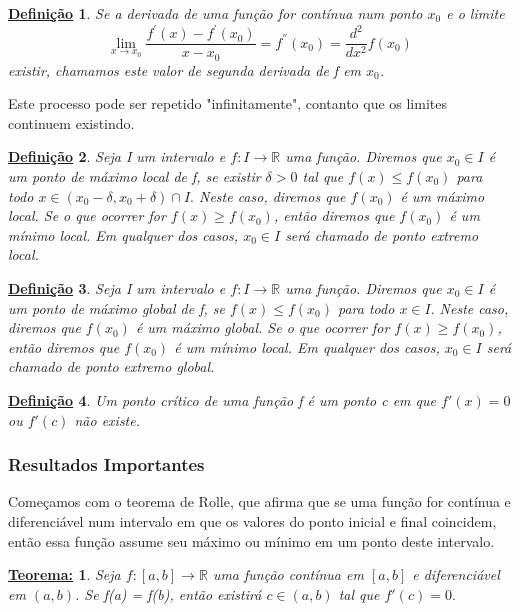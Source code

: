 \documentclass{article}
\newtheorem*{def*}{\underline{Defini\c c\~ao}}
\newtheorem*{thm*}{\underline{Teorema:}}
\begin{document}
    \begin{def*}
        Se a derivada de uma fun\c c\~ao for cont\'inua num ponto $x_0$ e o limite 
        $$
        \lim_{x\to{x_0}}\frac{f^{'}(x) - f^{'}(x_0)}{x - x_0} = f^{''}(x_0) = \frac{d^2}{dx^2}f(x_0)
        $$
        existir, chamamos este valor de segunda derivada de f em $x_0$.
    \end{def*}
    Este processo pode ser repetido "infinitamente", contanto que os limites continuem existindo. 

    \begin{def*}
        Seja I um intervalo e $f: I\rightarrow\mathbb{R}$ uma fun\c c\~ao. Diremos que $x_0\in{I}$ \'e um ponto de m\'aximo local de f, se existir $\delta > 0$
        tal que $f(x) \leq f(x_0)$ para todo $x\in(x_0 - \delta, x_0 + \delta)\cap{I}.$ Neste caso, diremos que $f(x_0)$ \'e um m\'aximo local. Se o que ocorrer for 
        $f(x) \geq f(x_0)$, ent\~ao diremos que $f(x_0)$ \'e um m\'inimo local. Em qualquer dos casos, $x_0\in{I}$ ser\'a chamado de ponto extremo local.
    \end{def*}

    \begin{def*}
        Seja I um intervalo e $f: I\rightarrow\mathbb{R}$ uma fun\c c\~ao. Diremos que $x_0\in{I}$ \'e um ponto de m\'aximo global de f, se $f(x) \leq f(x_0)$ para todo 
        $x\in{I}.$ Neste caso, diremos que $f(x_0)$ \'e um m\'aximo global. Se o que ocorrer for $f(x) \geq f(x_0)$, ent\~ao diremos que $f(x_0)$ \'e um m\'inimo local.
        Em qualquer dos casos, $x_0\in{I}$ ser\'a chamado de ponto extremo global.
    \end{def*}

    \begin{def*}
        Um ponto cr\'itico de uma fun\c c\~ao f \'e um ponto c em que $f'(x) = 0$ ou $f'(c)$ n\~ao existe.
    \end{def*}

    \subsubsection{Resultados Importantes}
    Come\c camos com o teorema de Rolle, que afirma que se uma fun\c c\~ao for cont\'inua e diferenci\'avel num intervalo em que os valores do ponto inicial e final
    coincidem, ent\~ao essa fun\c c\~ao assume seu m\'aximo ou m\'inimo em um ponto deste intervalo. 
    \begin{thm*}
        Seja $f:[a, b]\rightarrow\mathbb{R}$ uma fun\c c\~ao cont\'inua em $[a, b]$ e diferenci\'avel em $(a, b)$. Se f(a) = f(b), ent\~ao existir\'a $c\in(a, b)$ 
        tal que $f'(c) = 0.$ 
    \end{thm*}
\end{document}
